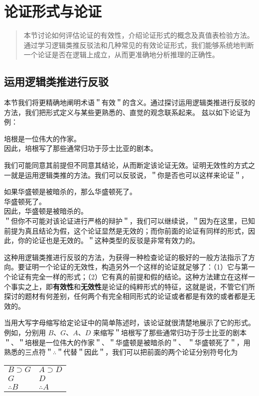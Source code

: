 \section{论证形式与论证}

\begin{quotation}
本节讨论如何评估论证的有效性，介绍论证形式的概念及真值表检验方法。通过学习逻辑类推反驳法和几种常见的有效论证形式，我们能够系统地判断一个论证是否在逻辑上成立，从而更准确地分析推理的正确性。
\end{quotation}

\subsection{运用逻辑类推进行反驳}
本节我们将更精确地阐明术语＂有效＂的含义。通过探讨运用逻辑类推进行反驳的方法，我们把形式定义与某些更熟悉的、直觉的观念联系起来。\cite{copi1980} 兹以如下论证为例：

培根是一位伟大的作家。\\
因此，培根写了那些通常归功于莎士比亚的剧本。

我们可能同意其前提但不同意其结论，从而断定该论证无效。证明无效性的方式之一就是运用逻辑类推的方法。我们可以反驳说，＂你是否也可以这样来论证＂，

如果华盛顿是被暗杀的，那么华盛顿死了。\\
华盛顿死了。\\
因此，华盛顿是被暗杀的。\\
＂但你不可能对该论证进行严格的辩护＂，我们可以继续说，＂因为在这里，已知前提为真且结论为假，这个论证显然是无效的；而你前面的论证有同样的形式，因此，你的论证也是无效的。＂这种类型的反驳是非常有效力的。

这种用逻辑类推进行反驳的方法，为获得一种检查论证的极好的一般方法指示了方向。要证明一个论证的无效性，构造另外一个这样的论证就足够了：（1）它与第一个论证有完全一样的形式；（2）它有真的前提和假的结论。这种方法建立在这样一个事实之上，即\textbf{有效性}和\textbf{无效性}是论证的纯粹形式的特征，这就是说，不管它们所探讨的题材有何差别，任何两个有完全相同形式的论证或者都是有效的或者都是无效的。\cite{jevons1886}

当用大写字母缩写给定论证中的简单陈述时，该论证就很清楚地展示了它的形式。例如，分别用 $B 、 G 、 A 、 D$ 来缩写＂培根写了那些通常归功于莎士比亚的剧本＂、＂培根是一位伟大的作家＂、＂华盛顿是被暗杀的＂、 ＂华盛顿死了＂，用熟悉的三点符＂$\therefore$＂代替＂因此＂，我们可以把前面的两个论证分别符号化为

\begin{center}
\begin{tabular}{ll}
$B \supset G$ & $A \supset D$ \\
$G$ & $D$ \\
$\therefore B$ & $\therefore A$ \\
\end{tabular}
\end{center}

